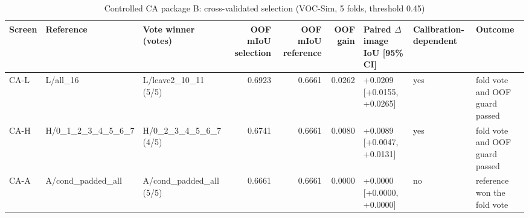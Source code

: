 \begin{table}[H]\centering\scriptsize\setlength{\tabcolsep}{3pt}
\begin{tabular}{>{\raggedright\arraybackslash}p{1.40cm}>{\raggedright\arraybackslash}p{1.40cm}>{\raggedright\arraybackslash}p{1.40cm}rrr>{\raggedright\arraybackslash}p{1.40cm}>{\raggedright\arraybackslash}p{1.40cm}>{\raggedright\arraybackslash}p{1.40cm}}
\toprule
Screen & Reference & Vote winner (votes) & OOF mIoU selection & OOF mIoU reference & OOF gain & Paired $\Delta$ image IoU [95\% CI] & Calibration-dependent & Outcome \\
\midrule
CA-L & L/\allowbreak{}all\_\allowbreak{}16 & L/\allowbreak{}leave2\_\allowbreak{}10\_\allowbreak{}11 (5/\allowbreak{}5) & 0.6923 & 0.6661 & 0.0262 & +0.0209 [+0.0155, +0.0265] & yes & fold vote and OOF guard passed \\
CA-H & H/\allowbreak{}0\_\allowbreak{}1\_\allowbreak{}2\_\allowbreak{}3\_\allowbreak{}4\_\allowbreak{}5\_\allowbreak{}6\_\allowbreak{}7 & H/\allowbreak{}0\_\allowbreak{}2\_\allowbreak{}3\_\allowbreak{}4\_\allowbreak{}5\_\allowbreak{}6\_\allowbreak{}7 (4/\allowbreak{}5) & 0.6741 & 0.6661 & 0.0080 & +0.0089 [+0.0047, +0.0131] & yes & fold vote and OOF guard passed \\
CA-A & A/\allowbreak{}cond\_\allowbreak{}padded\_\allowbreak{}all & A/\allowbreak{}cond\_\allowbreak{}padded\_\allowbreak{}all (5/\allowbreak{}5) & 0.6661 & 0.6661 & 0.0000 & +0.0000 [+0.0000, +0.0000] & no & reference won the fold vote \\
\bottomrule
\end{tabular}
\caption{Controlled CA package B: cross-validated selection (VOC-Sim, 5 folds, threshold 0.45)}\label{tab:a1_cv_summary}
\end{table}
